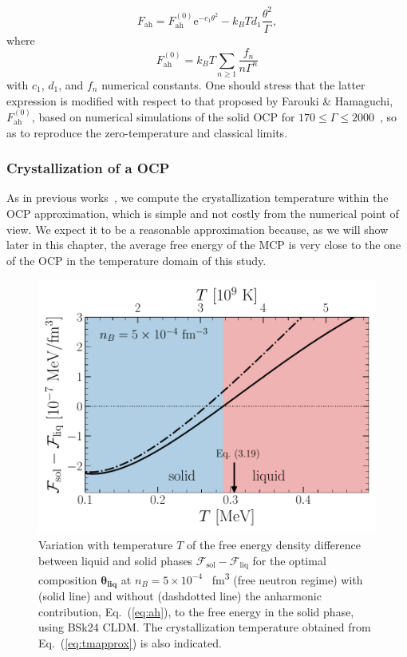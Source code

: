 \begin{equation}
  F_{\text{ah}} =
  F_{\text{ah}}^{(0)}\text{e}^{-c_1\theta^2} 
  - k_B T d_1\frac{\theta^2}{\Gamma},\label{eq:ah}
\end{equation}
%
where
%
\begin{equation}
  F_{\text{ah}}^{(0)} = k_B T\sum_{n \geq 1}\frac{f_n}{n\Gamma^n}
\end{equation}
%
with $c_1$, $d_1$, and $f_n$ numerical constants. One should stress that
the latter expression is modified with respect to that proposed by Farouki \&
Hamaguchi, $F_{\text{ah}}^{(0)}$, based on numerical simulations of 
the solid OCP for $170 \leq \Gamma \leq 2000$~\cite{Farouki1993}, so as to
reproduce the zero-temperature and classical limits.

\subsubsection{Crystallization of a OCP}

As in previous works~\cite{Fantina2020,Carreau2019,Carreau2020}, we compute 
the crystallization temperature within the OCP approximation, which is 
simple and not costly from the numerical point of view. We expect it to be a
reasonable approximation because, as we will show later in this chapter, the
average free energy of the MCP is very close to the one of the OCP in the
temperature domain of this study.

\begin{figure}[!t]
  \begin{center}
    \includegraphics[width=0.9\linewidth]{figures/fliqsol.pdf}
  \end{center}
  \caption[Free energy density difference between liquid and solid phases
  versus temperature]{Variation with temperature $T$ of the free energy density
  difference between liquid and solid phases
$\mathcal{F}_{\text{sol}}-\mathcal{F}_{\text{liq}}$ for the optimal composition
$\bm{\theta_{\text{liq}}}$ at $n_B=5\times 10^{-4}$ 
\si{\per \cubic\femto\meter} (free neutron regime) with (solid line) and 
without (dashdotted line) the anharmonic contribution, Eq.~(\ref{eq:ah}), to 
the free energy in the solid phase, using BSk24 CLDM. The crystallization 
temperature obtained from Eq.~(\ref{eq:tmapprox}) is also 
indicated.}\label{fig:fliqsol}
\end{figure}

